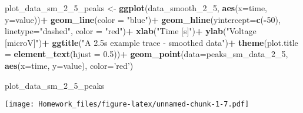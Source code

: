 \documentclass[]{article}
\newenvironment{Shaded}{\begin{snugshade}}{\end{snugshade}}
\newcommand{\KeywordTok}[1]{\textcolor[rgb]{0.13,0.29,0.53}{\textbf{#1}}}
\newcommand{\DataTypeTok}[1]{\textcolor[rgb]{0.13,0.29,0.53}{#1}}
\newcommand{\DecValTok}[1]{\textcolor[rgb]{0.00,0.00,0.81}{#1}}
\newcommand{\FloatTok}[1]{\textcolor[rgb]{0.00,0.00,0.81}{#1}}
\newcommand{\StringTok}[1]{\textcolor[rgb]{0.31,0.60,0.02}{#1}}
\newcommand{\OperatorTok}[1]{\textcolor[rgb]{0.81,0.36,0.00}{\textbf{#1}}}
\newcommand{\NormalTok}[1]{#1}
\begin{document}
\begin{Shaded}
\begin{Highlighting}[]
\NormalTok{plot_data_sm_2_5_peaks <-}\StringTok{ }\KeywordTok{ggplot}\NormalTok{(data_smooth_2_}\DecValTok{5}\NormalTok{, }\KeywordTok{aes}\NormalTok{(}\DataTypeTok{x=}\NormalTok{time, }\DataTypeTok{y=}\NormalTok{value))}\OperatorTok{+}
\StringTok{  }\KeywordTok{geom_line}\NormalTok{(}\DataTypeTok{color =} \StringTok{"blue"}\NormalTok{)}\OperatorTok{+}
\StringTok{  }\KeywordTok{geom_hline}\NormalTok{(}\DataTypeTok{yintercept=}\KeywordTok{c}\NormalTok{(}\OperatorTok{-}\DecValTok{50}\NormalTok{), }\DataTypeTok{linetype=}\StringTok{"dashed"}\NormalTok{, }\DataTypeTok{color =} \StringTok{"red"}\NormalTok{)}\OperatorTok{+}
\StringTok{  }\KeywordTok{xlab}\NormalTok{(}\StringTok{"Time [s]"}\NormalTok{)}\OperatorTok{+}
\StringTok{  }\KeywordTok{ylab}\NormalTok{(}\StringTok{"Voltage [microV]"}\NormalTok{)}\OperatorTok{+}
\StringTok{  }\KeywordTok{ggtitle}\NormalTok{(}\StringTok{"A 2.5s example trace - smoothed data"}\NormalTok{)}\OperatorTok{+}
\StringTok{  }\KeywordTok{theme}\NormalTok{(}\DataTypeTok{plot.title =} \KeywordTok{element_text}\NormalTok{(}\DataTypeTok{hjust =} \FloatTok{0.5}\NormalTok{))}\OperatorTok{+}
\StringTok{  }\KeywordTok{geom_point}\NormalTok{(}\DataTypeTok{data=}\NormalTok{peaks_sm_data_2_}\DecValTok{5}\NormalTok{, }\KeywordTok{aes}\NormalTok{(}\DataTypeTok{x=}\NormalTok{time, }\DataTypeTok{y=}\NormalTok{value), }\DataTypeTok{color=}\StringTok{'red'}\NormalTok{)}

\NormalTok{plot_data_sm_2_5_peaks}
\end{Highlighting}
\end{Shaded}

\texttt{[image: Homework\_files/figure-latex/unnamed-chunk-1-7.pdf]}
\end{document}

